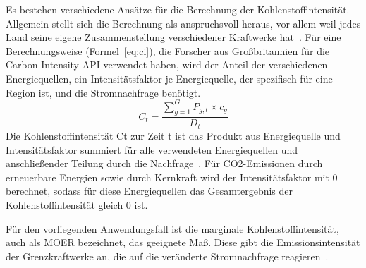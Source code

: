 Es bestehen verschiedene Ansätze für die Berechnung der Kohlenstoffintensität.
Allgemein stellt sich die Berechnung als anspruchsvoll heraus, vor allem weil jedes Land seine eigene Zusammenstellung verschiedener Kraftwerke hat~\cite{Currie.2024}.
Für eine Berechnungsweise (Formel~\ref{eq:ci}), die Forscher aus Großbritannien für die Carbon Intensity \ac{API} verwendet haben, wird der Anteil der verschiedenen Energiequellen, ein Intensitätsfaktor je Energiequelle, der spezifisch für eine Region ist, und die Stromnachfrage benötigt.
\begin{equation}
 \label{eq:ci}
 C_t = \frac{\sum_{g=1}^{G} P_{g,t} \times c_g}{D_t}
\end{equation}
Die Kohlenstoffintensität Ct zur Zeit t ist das Produkt aus Energiequelle und Intensitätsfaktor summiert für alle verwendeten Energiequellen und anschließender Teilung durch die Nachfrage~\cite{LyndonRuff.20220420T15:34:17.000Z}.
Für \ac{CO2}-Emissionen durch erneuerbare Energien sowie durch Kernkraft wird der Intensitätsfaktor mit 0 berechnet, sodass für diese Energiequellen das Gesamtergebnis der Kohlenstoffintensität gleich 0 ist.

Für den vorliegenden Anwendungsfall ist die marginale Kohlenstoffintensität, auch als \ac{MOER} bezeichnet, das geeignete Maß.
Diese gibt die Emissionsintensität der Grenzkraftwerke an, die auf die veränderte Stromnachfrage reagieren~\cite{Buchanan.2023}.

